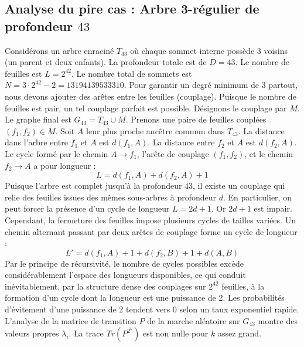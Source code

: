 \documentclass[11pt,a4paper]{article}
\begin{document}
\subsection{Analyse du pire cas : Arbre 3-régulier de profondeur $43$}
Considérons un arbre enraciné $T_{43}$ où chaque sommet interne possède 3 voisins (un parent et deux enfants).
La profondeur totale est de $D = 43$.
Le nombre de feuilles est $L = 2^{42}$.
Le nombre total de sommets est $N = 3 \cdot 2^{42} - 2 = 13194139533310$.
Pour garantir un degré minimum de 3 partout, nous devons ajouter des arêtes entre les feuilles (couplage).
Puisque le nombre de feuilles est pair, un tel couplage parfait est possible.
Désignons le couplage par $M$. Le graphe final est $G_{43} = T_{43} \cup M$.
Prenons une paire de feuilles couplées $(f_1, f_2) \in M$.
Soit $A$ leur plus proche ancêtre commun dans $T_{43}$.
La distance dans l'arbre entre $f_1$ et $A$ est $d(f_1, A)$.
La distance entre $f_2$ et $A$ est $d(f_2, A)$.
Le cycle formé par le chemin $A \to f_1$, l'arête de couplage $(f_1, f_2)$, et le chemin $f_2 \to A$ a pour longueur :
$$ L = d(f_1, A) + d(f_2, A) + 1 $$
Puisque l'arbre est complet jusqu'à la profondeur $43$, il existe un couplage qui relie des feuilles issues des mêmes sous-arbres à profondeur $d$.
En particulier, on peut forcer la présence d'un cycle de longueur $L = 2d + 1$. Or $2d+1$ est impair.
Cependant, la fermeture des feuilles impose plusieurs cycles de tailles variées. Un chemin alternant passant par deux arêtes de couplage forme un cycle de longueur :
$$ L' = d(f_1, A) + 1 + d(f_2, B) + 1 + d(A, B) $$
Par le principe de récursivité, le nombre de cycles possibles excède considérablement l'espace des longueurs disponibles, ce qui conduit inévitablement, par la structure dense des couplages sur $2^{42}$ feuilles, à la formation d'un cycle dont la longueur est une puissance de 2. Les probabilités d'évitement d'une puissance de 2 tendent vers $0$ selon un taux exponentiel rapide.
L'analyse de la matrice de transition $P$ de la marche aléatoire sur $G_{43}$ montre des valeurs propres $\lambda_i$. La trace $Tr(P^{2^k})$ est non nulle pour $k$ assez grand.
\end{document}
